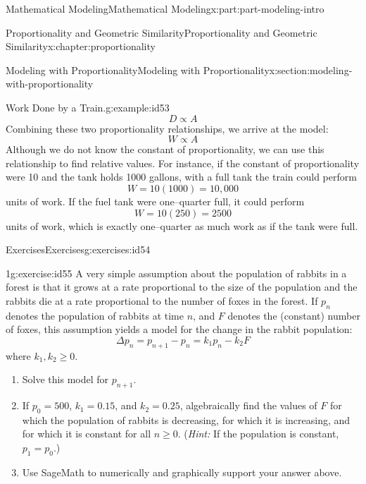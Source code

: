 \documentclass[oneside,10pt,]{book}
\numberwithin{equation}{section}
\begin{document}
\begin{partptx}{Mathematical Modeling}{}{Mathematical Modeling}{}{}{x:part:part-modeling-intro}
\begin{chapterptx}{Proportionality and Geometric Similarity}{}{Proportionality and Geometric Similarity}{}{}{x:chapter:proportionality}
\begin{sectionptx}{Modeling with Proportionality}{}{Modeling with Proportionality}{}{}{x:section:modeling-with-proportionality}
\begin{example}{Work Done by a Train.}{g:example:id53}
%
\begin{equation*}
D\propto A
\end{equation*}
Combining these two proportionality relationships, we arrive at the model:%
%
\begin{equation*}
W\propto A
\end{equation*}
Although we do not know the constant of proportionality, we can use this relationship to find relative values. For instance, if the constant of proportionality were 10 and the tank holds 1000 gallons, with a full tank the train could perform%
%
\begin{equation*}
W = 10 (1000) = 10,000 
\end{equation*}
units of work. If the fuel tank were one–quarter full, it could perform%
%
\begin{equation*}
W = 10(250) = 2500
\end{equation*}
units of work, which is exactly one–quarter as much work as if the tank were full.%
\end{example}
%
%
\typeout{************************************************}
\typeout{************************************************}
%
\begin{exercises-subsection-numberless}{Exercises}{}{Exercises}{}{}{g:exercises:id54}
\begin{divisionexercise}{1}{}{}{g:exercise:id55}%
A very simple assumption about the population of rabbits in a forest is that it grows at a rate proportional to the size of the population and the rabbits die at a rate proportional to the number of foxes in the forest. If \(p_n\) denotes the population of rabbits at time \(n\), and \(F\) denotes the (constant) number of foxes, this assumption yields a model for the change in the rabbit population:%
%
\begin{equation*}
\Delta p_n = p_{n+1}-p_{n} = k_1p_n - k_2 F
\end{equation*}
where \(k_1, k_2\ge 0\).%
\begin{enumerate}[font=\bfseries,label=(\alph*),ref=\alph*]
\item{}Solve this model for \(p_{n+1}\).%
\item{}If \(p_0 = 500\), \(k_1 = 0.15\), and \(k_2 = 0.25\), algebraically find the values of \(F\) for which the population of rabbits is decreasing, for which it is increasing, and for which it is constant for all \(n \ge 0\). (\emph{Hint:} If the population is constant, \(p_1 = p_0\).)%
\item{}Use SageMath to numerically and graphically support your answer above.%

\end{enumerate}
\end{divisionexercise}
\end{exercises-subsection-numberless}
\end{sectionptx}
\end{chapterptx}
\end{partptx}
\end{document}
